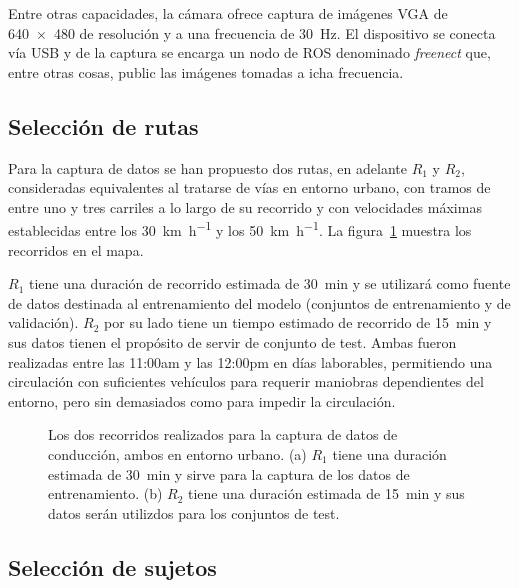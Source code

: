 Entre otras capacidades, la cámara ofrece captura de imágenes VGA de \SI{640x480}{\px} de resolución y a una frecuencia de \SI{30}{\Hz}. El dispositivo se conecta vía USB y de la captura se encarga un nodo de ROS denominado \textit{freenect} 	que, entre otras cosas, public las imágenes tomadas a icha frecuencia.

\subsection{Selección de rutas}

Para la captura de datos se han propuesto dos rutas, en adelante $R_1$ y $R_2$, consideradas equivalentes al tratarse de vías en entorno urbano, con tramos de entre uno y tres carriles a lo largo de su recorrido y con velocidades máximas establecidas entre los \SI{30}{\km\per\hour} y los \SI{50}{\km\per\hour}. La figura~\ref{fig:proposed-routes} muestra los recorridos en el mapa.

$R_1$ tiene una duración de recorrido estimada de \SI{30}{\minute} y se utilizará como fuente de datos destinada al entrenamiento del modelo (conjuntos de entrenamiento y de validación). $R_2$ por su lado tiene un tiempo estimado de recorrido de \SI{15}{\minute} y sus datos tienen el propósito de servir de conjunto de test. Ambas fueron realizadas entre las 11:00am y las 12:00pm en días laborables, permitiendo una circulación con suficientes vehículos para requerir maniobras dependientes del entorno, pero sin demasiados como para impedir la circulación.

\begin{figure}[t]
	\centering
	\qquad
	\caption[Los dos recorridos planteados para la captura de datos de conducción]{Los dos recorridos realizados para la captura de datos de conducción, ambos en entorno urbano. (a) $R_1$ tiene una duración estimada de \SI{30}{\minute} y sirve para la captura de los datos de entrenamiento. (b) $R_2$ tiene una duración estimada de \SI{15}{\minute} y sus datos serán utilizdos para los conjuntos de test.}
	\label{fig:proposed-routes}
\end{figure}

\subsection{Selección de sujetos}


